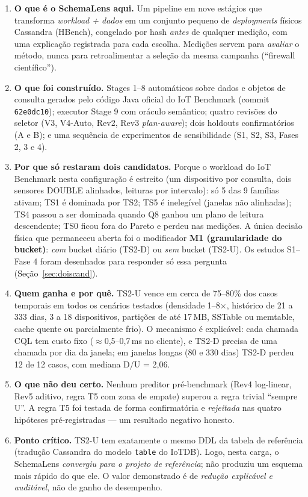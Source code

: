 \documentclass[11pt,a4paper]{article}
\begin{document}
\begin{enumerate}
\item \textbf{O que é o SchemaLens aqui.} Um pipeline em nove estágios que transforma \emph{workload + dados} em um conjunto pequeno de \emph{deployments} físicos Cassandra (HBench), congelado por hash \emph{antes} de qualquer medição, com uma explicação registrada para cada escolha. Medições servem para \emph{avaliar} o método, nunca para retroalimentar a seleção da mesma campanha (``firewall científico'').
\item \textbf{O que foi construído.} Stages 1--8 automáticos sobre dados e objetos de consulta gerados pelo código Java oficial do IoT Benchmark (commit \texttt{62e0dc10}); executor Stage 9 com oráculo semântico; quatro revisões do seletor (V3, V4-Auto, Rev2, Rev3 \emph{plan-aware}); dois holdouts confirmatórios (A e B); e uma sequência de experimentos de sensibilidade (S1, S2, S3, Fases 2, 3 e 4).
\item \textbf{Por que só restaram dois candidatos.} Porque o workload do IoT Benchmark nesta configuração é estreito (um dispositivo por consulta, dois sensores DOUBLE alinhados, leituras por intervalo): só 5 das 9 famílias ativam; TS1 é dominada por TS2; TS5 é inelegível (janelas não alinhadas); TS4 passou a ser dominada quando Q8 ganhou um plano de leitura descendente; TS0 ficou fora do Pareto e perdeu nas medições. A única decisão física que permaneceu aberta foi o modificador \textbf{M1 (granularidade do bucket)}: \emph{com} bucket diário (TS2-D) ou \emph{sem} bucket (TS2-U). Os estudos S1--Fase 4 foram desenhados para responder só essa pergunta (Seção~\ref{sec:doiscand}).
\item \textbf{Quem ganha e por quê.} TS2-U vence em cerca de 75--80\% dos casos temporais em todos os cenários testados (densidade 1--8$\times$, histórico de 21 a 333 dias, 3 a 18 dispositivos, partições de até 17\,MB, SSTable ou memtable, cache quente ou parcialmente frio). O mecanismo é explicável: cada chamada CQL tem custo fixo ($\approx$0,5--0,7\,ms no cliente), e TS2-D precisa de uma chamada por dia da janela; em janelas longas (80 e 330 dias) TS2-D perdeu 12 de 12 casos, com mediana D/U = 2,06.
\item \textbf{O que não deu certo.} Nenhum preditor pré-benchmark (Rev4 log-linear, Rev5 aditivo, regra T5 com zona de empate) superou a regra trivial ``sempre U''. A regra T5 foi testada de forma confirmatória e \emph{rejeitada} nas quatro hipóteses pré-registradas --- um resultado negativo honesto.
\item \textbf{Ponto crítico.} TS2-U tem exatamente o mesmo DDL da tabela de referência (tradução Cassandra do modelo \texttt{table} do IoTDB). Logo, nesta carga, o SchemaLens \emph{convergiu para o projeto de referência}; não produziu um esquema mais rápido do que ele. O valor demonstrado é de \emph{redução explicável e auditável}, não de ganho de desempenho.
\end{enumerate}
\end{document}
